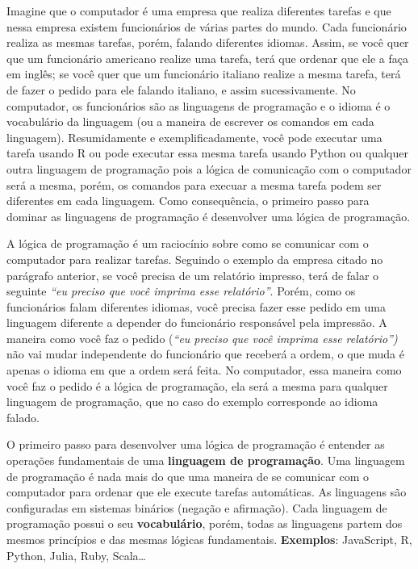 \documentclass[
  letterpaper,
  DIV=11,
  numbers=noendperiod]{scrreprt}
\begin{document}
Imagine que o computador é uma empresa que realiza diferentes tarefas e
que nessa empresa existem funcionários de várias partes do mundo. Cada
funcionário realiza as mesmas tarefas, porém, falando diferentes
idiomas. Assim, se você quer que um funcionário americano realize uma
tarefa, terá que ordenar que ele a faça em inglês; se você quer que um
funcionário italiano realize a mesma tarefa, terá de fazer o pedido para
ele falando italiano, e assim sucessivamente. No computador, os
funcionários são as linguagens de programação e o idioma é o vocabulário
da linguagem (ou a maneira de escrever os comandos em cada linguagem).
Resumidamente e exemplificadamente, você pode executar uma tarefa usando
R ou pode executar essa mesma tarefa usando Python ou qualquer outra
linguagem de programação pois a lógica de comunicação com o computador
será a mesma, porém, os comandos para execuar a mesma tarefa podem ser
diferentes em cada linguagem. Como consequência, o primeiro passo para
dominar as linguagens de programação é desenvolver uma lógica de
programação.

A lógica de programação é um raciocínio sobre como se comunicar com o
computador para realizar tarefas. Seguindo o exemplo da empresa citado
no parágrafo anterior, se você precisa de um relatório impresso, terá de
falar o seguinte \emph{``eu preciso que você imprima esse relatório''}.
Porém, como os funcionários falam diferentes idiomas, você precisa fazer
esse pedido em uma linguagem diferente a depender do funcionário
responsável pela impressão. A maneira como você faz o pedido (\emph{``eu
preciso que você imprima esse relatório'')} não vai mudar independente
do funcionário que receberá a ordem, o que muda é apenas o idioma em que
a ordem será feita. No computador, essa maneira como você faz o pedido é
a lógica de programação, ela será a mesma para qualquer linguagem de
programação, que no caso do exemplo corresponde ao idioma falado.

O primeiro passo para desenvolver uma lógica de programação é entender
as operações fundamentais de uma \textbf{linguagem de programação}. Uma
linguagem de programação é nada mais do que uma maneira de se comunicar
com o computador para ordenar que ele execute tarefas automáticas. As
linguagens são configuradas em sistemas binários (negação e afirmação).
Cada linguagem de programação possui o seu \textbf{vocabulário}, porém,
todas as linguagens partem dos mesmos princípios e das mesmas lógicas
fundamentais. \textbf{Exemplos}: JavaScript, R, Python, Julia, Ruby,
Scala\ldots{}
\end{document}
